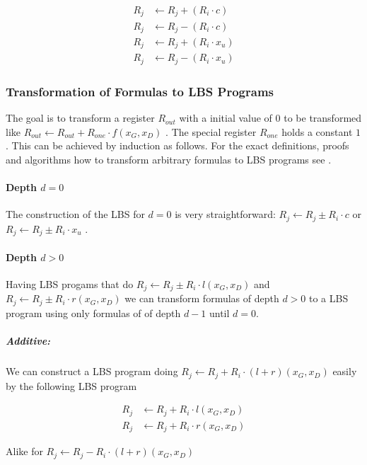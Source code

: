 \documentclass[12pt, a4paper]{article}
\begin{document}
\begin{align}
R_j & \leftarrow R_j + (R_i \cdot c) \\
R_j & \leftarrow R_j - (R_i \cdot c) \\
R_j & \leftarrow R_j + (R_i \cdot x_u) \\
R_j & \leftarrow R_j - (R_i \cdot x_u)
\end{align}


\subsubsection{Transformation of Formulas to LBS Programs}

The goal is to transform a register $R_{out}$ with a initial value of $0$ to be
transformed like $R_{out} \leftarrow R_{out} + R_{one} \cdot f(x_G,x_D)$ . The
special register $R_{one}$ holds a constant $1$. This can be achieved by
induction as follows.  For the exact definitions, proofs and algorithms how to
transform arbitrary formulas to LBS programs see \cite{cleve91}.


\paragraph{Depth $d = 0$}

The construction of the LBS for $d = 0$ is very straightforward:
$R_j \leftarrow R_j \pm R_i \cdot c$ or $R_j \leftarrow R_j \pm R_i \cdot x_u$ .


\paragraph{Depth $d > 0$}

Having LBS progams that do $R_j \leftarrow R_j \pm R_i \cdot l(x_G, x_D)$  and
$R_j \leftarrow R_j \pm R_i \cdot r(x_G, x_D)$ we can
transform formulas of depth $d > 0$ to a LBS program using only formulas of
of depth $d - 1$ until $d = 0$.

\subparagraph{Additive:} We can construct a LBS program doing $R_j \leftarrow
R_j + R_i \cdot (l + r)(x_G, x_D)$ easily by the following LBS program

\begin{align*}
R_j & \leftarrow R_j + R_i \cdot l(x_G, x_D) \\
R_j & \leftarrow R_j + R_i \cdot r(x_G, x_D)
\end{align*}

Alike for $R_j \leftarrow R_j - R_i \cdot (l + r)(x_G, x_D)$
\end{document}
